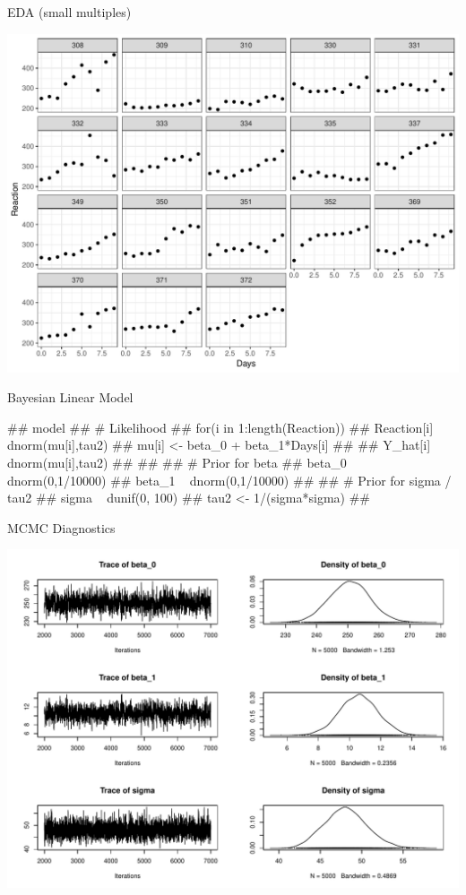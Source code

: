 \documentclass[11pt,ignorenonframetext,]{beamer}
\let\oldverbatim\verbatim
\let\endoldverbatim\endverbatim
\renewenvironment{verbatim}{\footnotesize\begin{spacing}{0.9}\oldverbatim}{\endoldverbatim\end{spacing}}
\begin{document}
\begin{frame}{EDA (small multiples)}

\includegraphics{Lec5_files/figure-beamer/unnamed-chunk-3-1.pdf}

\end{frame}

\begin{frame}[fragile]{Bayesian Linear Model}

\begin{verbatim}
## model{
##   # Likelihood
##   for(i in 1:length(Reaction)){
##     Reaction[i] ~ dnorm(mu[i],tau2)
##     mu[i] <- beta_0 + beta_1*Days[i]
## 
##     Y_hat[i] ~ dnorm(mu[i],tau2)
##   }
## 
##   # Prior for beta
##   beta_0 ~ dnorm(0,1/10000)
##   beta_1 ~ dnorm(0,1/10000)
## 
##   # Prior for sigma / tau2
##   sigma ~ dunif(0, 100) 
##   tau2 <- 1/(sigma*sigma)
## }
\end{verbatim}

\end{frame}

\begin{frame}{MCMC Diagnostics}

\begin{center}\includegraphics{Lec5_files/figure-beamer/unnamed-chunk-6-1} \end{center}

\end{frame}
\end{document}
